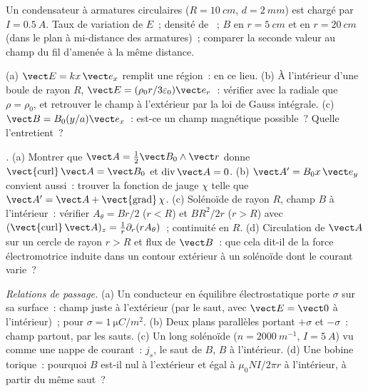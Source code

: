 \begin{exercise}[$\star$]\label{exo:b2:maxwell-equations:3}
Un condensateur à armatures circulaires ($R = \qty{10}{cm}$, $d = \qty{2}{mm}$) est
chargé par $I = \qty{0.5}{A}$. Taux de variation de $E$~; densité de ~; $B$ en $r = \qty{5}{cm}$ et en $r = \qty{20}{cm}$ (dans le
plan à mi-distance des armatures)~; comparer la seconde valeur au champ
du fil d'amenée à la même distance.
\end{exercise}

\begin{exercise}[$\star$]\label{exo:b2:maxwell-equations:4}
(a) $\vect E = kx\,\vect e_x$ remplit une région~:  en ce lieu. (b)
À l'intérieur d'une boule de rayon $R$, $\vect E = (\rho_0r/3\varepsilon_0)\vect e_r$~: vérifier avec
la  radiale que $\rho = \rho_0$, et retrouver le champ à l'extérieur
par la loi de Gauss intégrale. (c) $\vect B = B_0(y/a)\vect e_x$~: est-ce un champ
magnétique possible~? Quelle  l'entretient~?
\end{exercise}

\begin{exercise}[$\star\star$]\label{exo:b2:maxwell-equations:5}
\emph{.} (a) Montrer que $\vect A = \tfrac12\vect B_0\wedge\vect r$
donne $\operatorname{\vect{curl}}\vect A = \vect B_0$ et $\operatorname{div}\vect A = 0$.
(b) $\vect A' = B_0x\,\vect e_y$ convient aussi~: trouver la fonction de jauge $\chi$ telle que
$\vect A' = \vect A + \operatorname{\vect{grad}}\chi$. (c) Solénoïde de rayon $R$,
champ $B$ à l'intérieur~: vérifier $A_\theta = Br/2$ ($r < R$) et $BR^2/2r$ ($r > R$)
avec $(\operatorname{\vect{curl}}\vect A)_z = \frac1r\partial_r(rA_\theta)$~; continuité en $R$.
(d) Circulation de $\vect A$ sur un cercle de rayon $r > R$ et flux de
$\vect B$~: que cela dit-il de la force électromotrice induite dans un contour extérieur à un
solénoïde dont le courant varie~?
\end{exercise}

\begin{exercise}[$\star\star$]\label{exo:b2:maxwell-equations:6}
\emph{Relations de passage.} (a) Un conducteur en équilibre
électrostatique porte $\sigma$ sur sa surface~: champ juste à l'extérieur (par le
saut, avec $\vect E = \vect 0$ à l'intérieur)~; pour $\sigma = \qty{1}{\micro C/m^2}$. (b) Deux
plans parallèles portant $+\sigma$ et $-\sigma$~: champ partout, par les sauts.
(c) Un long solénoïde ($n = \qty{2000}{m^{-1}}$, $I = \qty{5}{A}$) vu comme une nappe de
courant~: $j_s$, le saut de $B$, $B$ à l'intérieur. (d) Une bobine torique~: pourquoi $B$
est-il nul à l'extérieur et égal à $\mu_0NI/2\pi r$ à l'intérieur, à partir du même saut~?
\end{exercise}

